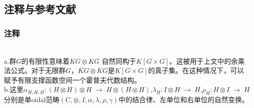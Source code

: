 \subsection{注释与参考文献}
\subsubsection{注释}\\
a.群$G$的有限性意味着$KG \otimes KG$ 自然同构于$K[G \times G]$。这被用于上文中的余乘法公式。对于无限群$G$，$KG \otimes KG$是$K[G \times G]$的真子集。在这种情况下，可以赋予有限支撑函数空间一个霍普夫代数结构。\\
b.这里$\alpha_{H,H,H} : (H \otimes H) \otimes H \;\to\; H \otimes (H \otimes H)$,$\lambda_H : I \otimes H \;\to\; H$,$
\rho_H : H \otimes I \;\to\; H$分别是单oidal范畴$(C, \otimes, I, \alpha, \lambda, \rho, \gamma)$中的结合律、左单位和右单位的自然变换。
